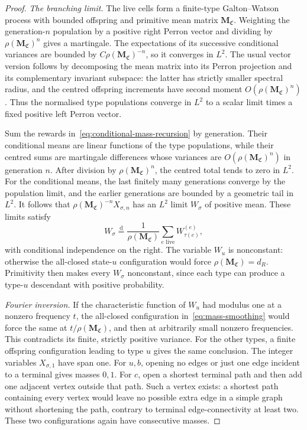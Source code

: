 \begin{proof}
\emph{The branching limit.}
The live cells form a finite-type Galton--Watson process with bounded offspring and primitive mean matrix $\mathbf M_{\mathfrak C}$.
Weighting the generation-$n$ population by a positive right Perron vector and dividing by $\rho(\mathbf M_{\mathfrak C})^n$ gives a martingale.
The expectations of its successive conditional variances are bounded by $C\rho(\mathbf M_{\mathfrak C})^{-n}$, so it converges in $L^2$.
The usual vector version follows by decomposing the mean matrix into its Perron projection and its complementary invariant subspace: the latter has strictly smaller spectral radius, and the centred offspring increments have second moment $O(\rho(\mathbf M_{\mathfrak C})^n)$.
Thus the normalised type populations converge in $L^2$ to a scalar limit times a fixed positive left Perron vector.

Sum the rewards in~\eqref{eq:conditional-mass-recursion} by generation.
Their conditional means are linear functions of the type populations, while their centred sums are martingale differences whose variances are $O(\rho(\mathbf M_{\mathfrak C})^n)$ in generation $n$.
After division by $\rho(\mathbf M_{\mathfrak C})^n$, the centred total tends to zero in $L^2$.
For the conditional means, the last finitely many generations converge by the population limit, and the earlier generations are bounded by a geometric tail in $L^2$.
It follows that $\rho(\mathbf M_{\mathfrak C})^{-n}X_{\sigma,n}$ has an $L^2$ limit $W_\sigma$ of positive mean.
These limits satisfy
\begin{equation}\label{eq:mass-smoothing}
 W_\sigma\overset{\mathrm d}=
 \frac1{\rho(\mathbf M_{\mathfrak C})}
 \sum_{e\text{ live}}W_{\tau(e)}^{(e)},
\end{equation}
with conditional independence on the right.
The variable $W_u$ is nonconstant: otherwise the all-closed state-$u$ configuration would force $\rho(\mathbf M_{\mathfrak C})=d_R$.
Primitivity then makes every $W_\sigma$ nonconstant, since each type can produce a type-$u$ descendant with positive probability.

\emph{Fourier inversion.}
If the characteristic function of $W_u$ had modulus one at a nonzero frequency $t$, the all-closed configuration in~\eqref{eq:mass-smoothing} would force the same at $t/\rho(\mathbf M_{\mathfrak C})$, and then at arbitrarily small nonzero frequencies.
This contradicts its finite, strictly positive variance.
For the other types, a finite offspring configuration leading to type $u$ gives the same conclusion.
The integer variables $X_{\sigma,1}$ have span one.
For $u,b$, opening no edges or just one edge incident to a terminal gives masses $0,1$.
For $c$, open a shortest terminal path and then add one adjacent vertex outside that path.
Such a vertex exists: a shortest path containing every vertex would leave no possible extra edge in a simple graph without shortening the path, contrary to terminal edge-connectivity at least two.
These two configurations again have consecutive masses.


\end{proof}
